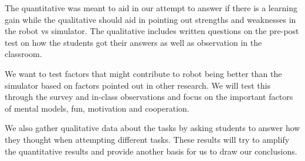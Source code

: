 The quantitative was meant to aid in our attempt to answer if there is a learning gain while the qualitative should aid in pointing out strengths and weaknesses in the robot vs simulator. The qualitative includes written questions on the pre-post test on how the students got their answers as well as observation in the classroom. 

We want to test factors that might contribute to robot being better than the simulator based on factors pointed out in other research. We will test this through the survey and in-class observations and focus on the important factors of mental models, fun, motivation and cooperation. 

We also gather qualitative data about the tasks by asking students to answer how they thought when attempting different tasks. These results will try to amplify the quantitative results and provide another basis for us to draw our conclusions. 

